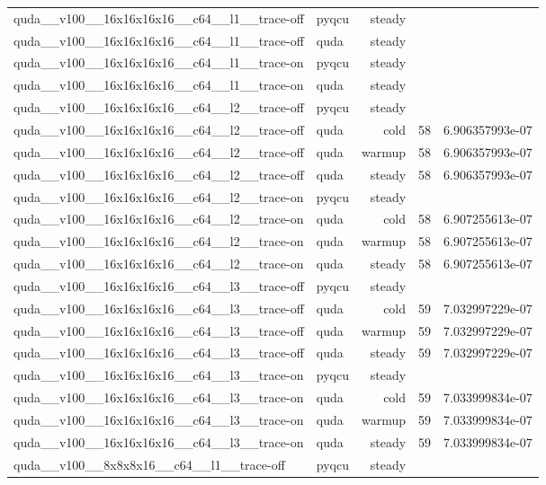 \begin{table}[htbp]
\begin{tabular}{@{}llrrr@{}}
quda\_\_v100\_\_16x16x16x16\_\_c64\_\_l1\_\_trace-off & pyqcu & steady &  &  \\
quda\_\_v100\_\_16x16x16x16\_\_c64\_\_l1\_\_trace-off & quda & steady &  &  \\
quda\_\_v100\_\_16x16x16x16\_\_c64\_\_l1\_\_trace-on & pyqcu & steady &  &  \\
quda\_\_v100\_\_16x16x16x16\_\_c64\_\_l1\_\_trace-on & quda & steady &  &  \\
quda\_\_v100\_\_16x16x16x16\_\_c64\_\_l2\_\_trace-off & pyqcu & steady &  &  \\
quda\_\_v100\_\_16x16x16x16\_\_c64\_\_l2\_\_trace-off & quda & cold & 58 & 6.906357993e-07 \\
quda\_\_v100\_\_16x16x16x16\_\_c64\_\_l2\_\_trace-off & quda & warmup & 58 & 6.906357993e-07 \\
quda\_\_v100\_\_16x16x16x16\_\_c64\_\_l2\_\_trace-off & quda & steady & 58 & 6.906357993e-07 \\
quda\_\_v100\_\_16x16x16x16\_\_c64\_\_l2\_\_trace-on & pyqcu & steady &  &  \\
quda\_\_v100\_\_16x16x16x16\_\_c64\_\_l2\_\_trace-on & quda & cold & 58 & 6.907255613e-07 \\
quda\_\_v100\_\_16x16x16x16\_\_c64\_\_l2\_\_trace-on & quda & warmup & 58 & 6.907255613e-07 \\
quda\_\_v100\_\_16x16x16x16\_\_c64\_\_l2\_\_trace-on & quda & steady & 58 & 6.907255613e-07 \\
quda\_\_v100\_\_16x16x16x16\_\_c64\_\_l3\_\_trace-off & pyqcu & steady &  &  \\
quda\_\_v100\_\_16x16x16x16\_\_c64\_\_l3\_\_trace-off & quda & cold & 59 & 7.032997229e-07 \\
quda\_\_v100\_\_16x16x16x16\_\_c64\_\_l3\_\_trace-off & quda & warmup & 59 & 7.032997229e-07 \\
quda\_\_v100\_\_16x16x16x16\_\_c64\_\_l3\_\_trace-off & quda & steady & 59 & 7.032997229e-07 \\
quda\_\_v100\_\_16x16x16x16\_\_c64\_\_l3\_\_trace-on & pyqcu & steady &  &  \\
quda\_\_v100\_\_16x16x16x16\_\_c64\_\_l3\_\_trace-on & quda & cold & 59 & 7.033999834e-07 \\
quda\_\_v100\_\_16x16x16x16\_\_c64\_\_l3\_\_trace-on & quda & warmup & 59 & 7.033999834e-07 \\
quda\_\_v100\_\_16x16x16x16\_\_c64\_\_l3\_\_trace-on & quda & steady & 59 & 7.033999834e-07 \\
quda\_\_v100\_\_8x8x8x16\_\_c64\_\_l1\_\_trace-off & pyqcu & steady &  &  \\

\end{tabular}
\end{table}
